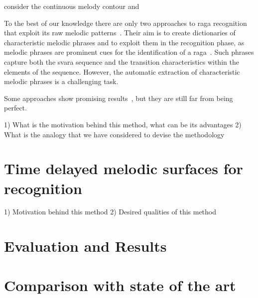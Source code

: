 consider the continuous melody contour and 

To the best of our knowledge there are only two approaches to \gls{raga} recognition that exploit its raw melodic patterns~\cite{shrey_ISMIR_2015, sridhar2009raga}. Their aim is to create dictionaries of characteristic melodic phrases and to exploit them in the recognition phase, as melodic phrases are prominent cues for the identification of a \gls{raga}~\cite{rao1999raga}. Such phrases capture both the svara sequence and the transition characteristics within the elements of the sequence. However, the automatic extraction of characteristic melodic phrases is a challenging task. 

Some approaches show promising results~\cite{gulatiphrase_2016}, but they are still far from being perfect. 


1) What is the motivation behind this method, what can be its advantages
2) What is the analogy that we have considered to devise the methodology


\section{Time delayed melodic surfaces for  recognition}

1) Motivation behind this method
2) Desired qualities of this method

\section{Evaluation and Results}
\section{Comparison with state of the art}



